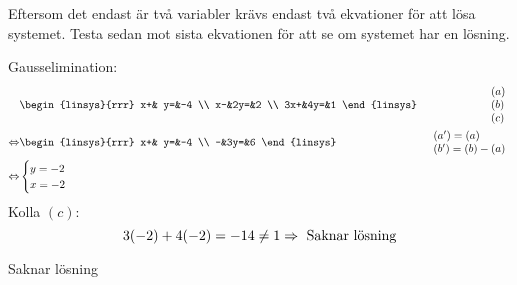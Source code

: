 \pagebreak
\begin{task}{1.9}
	Eftersom det endast är två variabler krävs endast två ekvationer för att lösa systemet. Testa sedan mot sista ekvationen för att se om systemet har en lösning.
	
	Gausselimination:
	\begin{align*}
		&\begin{linsys}{rrr}
			 x+& y=&-4 \\
			 x-&2y=&2 \\
			3x+&4y=&1
		\end{linsys}
		&\begin{array}{l} 
			(a) \\ 
			(b) \\
			(c)
		\end{array} \\ \lra
		&\begin{linsys}{rrr}
			x+& y=&-4 \\
			 -&3y=&6
		\end{linsys}
		&\begin{array}{l} 
			(a')=(a) \\ 
			(b')=(b)-(a)
		\end{array} \\ \lra
		&\begin{cases}
			y=-2 \\
			x=-2
		\end{cases}
	\end{align*}
	Kolla $(c)$:
	\[3\*(-2)+4\*(-2)=-14\neq1 \Rightarrow \text{ Saknar lösning}\]
	
	\ans Saknar lösning
\end{task}

